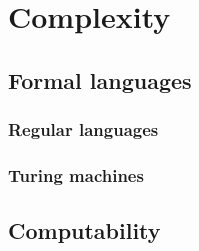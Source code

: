 \chapter{Complexity}\label{chapter:complexity}

\section{Formal languages}

\subsection{Regular languages}


\subsection{Turing machines}



\section{Computability}


